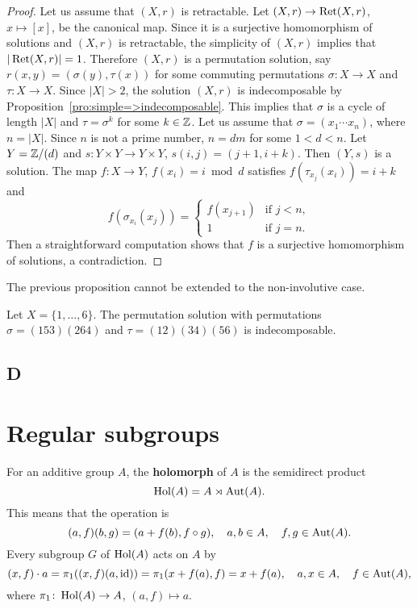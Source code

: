 \begin{proof}
Let us assume that $(X,r)$ is retractable. 
Let $(X,r)\to\operatorname{Ret}(X,r)$, $x\mapsto [x]$, be the canonical map. Since it is a surjective homomorphism of solutions
and $(X,r)$ is retractable, the simplicity of $(X,r)$ implies that $|\operatorname{Ret}(X,r)|=1$. Therefore $(X,r)$ is a permutation solution, say 
$r(x,y)=(\sigma(y),\tau(x))$ for some commuting permutations $\sigma\colon X\to X$
and $\tau\colon X\to X$. Since $|X|>2$, the solution $(X,r)$ 
is indecomposable by Proposition~\ref{pro:simple=>indecomposable}. This implies that $\sigma$ is a cycle of length $|X|$
and $\tau=\sigma^k$ for some $k\in\mathbb{Z}$. Let us assume that 
$\sigma=(x_1\cdots x_n)$, where $n=|X|$. 
Since $n$ is not a prime number, $n=dm$ for some $1<d<n$. Let $Y=\mathbb{Z}/(d)$ and
$s\colon Y\times Y\to Y\times Y$, $s(i,j)=(j+1,i+k)$. Then $(Y,s)$ is a solution. 
The map
$f\colon X\to Y$, $f(x_i)=i\bmod d$
satisfies $f(\tau_{x_j}(x_i))=i+k$ and 
\[
f(\sigma_{x_i}(x_j))
=\begin{cases}
f(x_{j+1}) & \text{if $j<n$},\\
1 & \text{if $j=n$}.
\end{cases}
\]
Then a straightforward computation shows that $f$ is a 
surjective homomorphism of solutions, a contradiction. 
\end{proof}

The previous proposition cannot be extended to the non-involutive case. 

\begin{example}
Let $X=\{1,\dots,6\}$. The permutation solution with 
permutations $\sigma=(153)(264)$ and $\tau=(12)(34)(56)$ is indecomposable.
\end{example}

\section*{D}

\chapter{Regular subgroups}

For an additive group $A$, the \textbf{holomorph} of $A$ is the semidirect product 
\[
	\operatorname{Hol}(A)=A\rtimes\operatorname{Aut}(A).
\]
This means that the operation is 
\[
	(a,f)(b,g)=(a+f(b),f\circ g),\quad
	a,b\in A,\quad
	f,g\in\operatorname{Aut}(A).
\]
Every subgroup $G$ of $\operatorname{Hol}(A)$ acts on $A$ by 
\[
	(x,f)\cdot a=\pi_1( (x,f)(a,\operatorname{id}) )=\pi_1(x+f(a),f)=x+f(a),\quad
	a,x\in A,\quad 
	f\in\operatorname{Aut}(A),
\]
where $\pi_1\colon \operatorname{Hol}(A)\to A$, $(a,f)\mapsto a$. 

